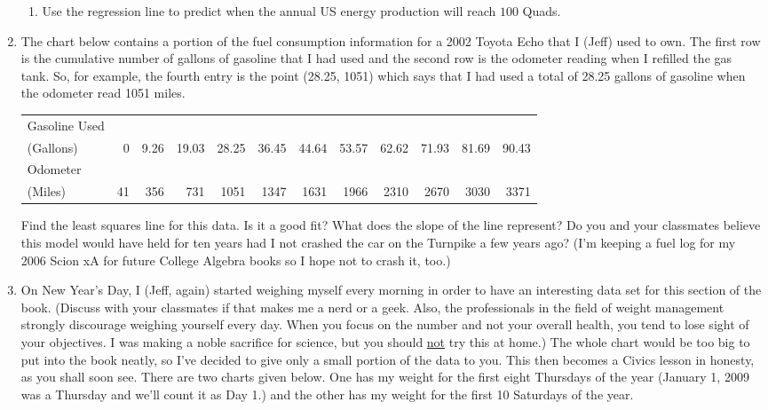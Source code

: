 \begin{enumerate}
\begin{enumerate}
\item  Use the regression line to predict when the annual US energy production will reach $100$ Quads.

\end{enumerate}


\item The chart below contains a portion of the fuel consumption information for a 2002 Toyota Echo that I (Jeff) used to own.  The first row is the cumulative number of gallons of gasoline that I had used and the second row is the odometer reading when I refilled the gas tank.  So, for example, the fourth entry is the point (28.25, 1051) which says that I had used a total of 28.25 gallons of gasoline when the odometer read 1051 miles.

\medskip

\small

\noindent \begin{tabular}{|l|r|r|r|r|r|r|r|r|r|r|r|} \hline
Gasoline Used & & & & & & & & & & & \\
(Gallons)  & 0 & 9.26 & 19.03 & 28.25 & 36.45 & 44.64 & 53.57 & 62.62 & 71.93 & 81.69 & 90.43\\ 
\hline 
Odometer & & & & & & & & & & & \\
(Miles) & 41 & 356 & 731 & 1051 & 1347 & 1631 & 1966 & 2310 & 2670 & 3030 & 3371\\ \hline
\end{tabular}

\normalsize

\medskip

\noindent Find the least squares line for this data.  Is it a good fit?  What does the slope of the line represent?  Do you and your classmates believe this model would have held for ten years had I not crashed the car on the Turnpike a few years ago?  (I'm keeping a fuel log for my 2006 Scion xA for future College Algebra books so I hope not to crash it, too.)

\item On New Year's Day, I (Jeff, again) started weighing myself every morning in order to have an interesting data set for this section of the book.  (Discuss with your classmates if that makes me a nerd or a geek.  Also, the professionals in the field of weight management strongly discourage weighing yourself every day.  When you focus on the number and not your overall health, you tend to lose sight of your objectives.  I was making a noble sacrifice for science, but you should \underline{not} try this at home.)  The whole chart would be too big to put into the book neatly, so I've decided to give only a small portion of the data to you.  This then becomes a Civics lesson in honesty, as you shall soon see.  There are two charts given below.  One has my weight for the first eight Thursdays of the year (January 1, 2009 was a Thursday and we'll count it as Day 1.) and the other has my weight for the first 10 Saturdays of the year.  


\end{enumerate}
